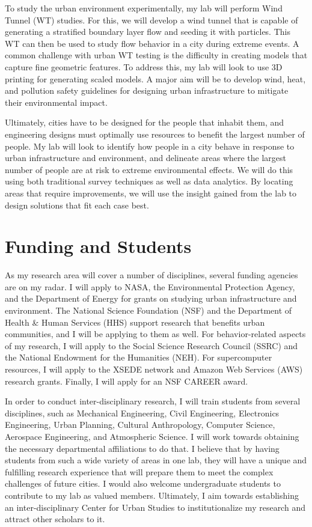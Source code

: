 \documentclass[12pt]{article}
\begin{document}
To study the urban environment experimentally, my lab will perform Wind Tunnel (WT) studies. For this, we will develop a wind tunnel that is capable of generating a stratified boundary layer flow and seeding it with particles. This WT can then be used to study flow behavior in a city during extreme events. A common challenge with urban WT testing is the difficulty in creating models that capture fine geometric features. To address this, my lab will look to use 3D printing for generating scaled models. A major aim will be to develop wind, heat, and pollution safety guidelines for designing urban infrastructure to mitigate their environmental impact. 

Ultimately, cities have to be designed for the people that inhabit them, and engineering designs must optimally use resources to benefit the largest number of people. My lab will look to identify how people in a city behave in response to urban infrastructure and environment, and delineate areas where the largest number of people are at risk to extreme environmental effects. We will do this using both traditional survey techniques as well as data analytics. By locating areas that require improvements, we will use the insight gained from the lab to design solutions that fit each case best. 

\section*{Funding and Students}
As my research area will cover a number of disciplines, several funding agencies are on my radar. I will apply to NASA, the Environmental Protection Agency, and the Department of Energy for grants on studying urban infrastructure and environment. The National Science Foundation (NSF) and the Department of Health \& Human Services (HHS) support research that benefits urban communities, and I will be applying to them as well. For behavior-related aspects of my research, I will apply to the Social Science Research Council (SSRC) and the National Endowment for the Humanities (NEH). For supercomputer resources, I will apply to the XSEDE network and Amazon Web Services (AWS) research grants. Finally, I will apply for an NSF CAREER award.

In order to conduct inter-disciplinary research, I will train students from several disciplines, such as Mechanical Engineering, Civil Engineering, Electronics Engineering, Urban Planning, Cultural Anthropology, Computer Science, Aerospace Engineering, and Atmospheric Science. I will work towards obtaining the necessary departmental affiliations to do that. I believe that by having students from such a wide variety of areas in one lab, they will have a unique and fulfilling research experience that will prepare them to meet the complex challenges of future cities. I would also welcome undergraduate students to contribute to my lab as valued members. Ultimately, I aim towards establishing an inter-disciplinary Center for Urban Studies to institutionalize my research and attract other scholars to it.

 

\end{document}
